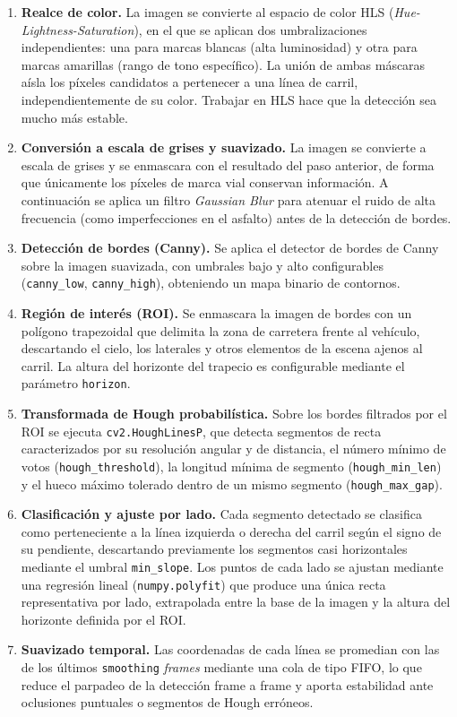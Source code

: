\documentclass[12pt, a4paper]{article}
\begin{document}
\begin{enumerate}
	\item \textbf{Realce de color.} La imagen se convierte al espacio de color HLS (\textit{Hue-Lightness-Saturation}), en el que se aplican dos umbralizaciones independientes: una para marcas blancas (alta luminosidad) y otra para marcas amarillas (rango de tono específico). La unión de ambas máscaras aísla los píxeles candidatos a pertenecer a una línea de carril, independientemente de su color. Trabajar en HLS hace que la detección sea mucho más estable.
	\item \textbf{Conversión a escala de grises y suavizado.} La imagen se convierte a escala de grises y se enmascara con el resultado del paso anterior, de forma que únicamente los píxeles de marca vial conservan información. A continuación se aplica un filtro \textit{Gaussian Blur} para atenuar el ruido de alta frecuencia (como imperfecciones en el asfalto) antes de la detección de bordes.
	\item \textbf{Detección de bordes (Canny).} Se aplica el detector de bordes de Canny sobre la imagen suavizada, con umbrales bajo y alto configurables (\texttt{canny\_low}, \texttt{canny\_high}), obteniendo un mapa binario de contornos.
	\item \textbf{Región de interés (ROI).} Se enmascara la imagen de bordes con un polígono trapezoidal que delimita la zona de carretera frente al vehículo, descartando el cielo, los laterales y otros elementos de la escena ajenos al carril. La altura del horizonte del trapecio es configurable mediante el parámetro \texttt{horizon}.
	\item \textbf{Transformada de Hough probabilística.} Sobre los bordes filtrados por el ROI se ejecuta \texttt{cv2.HoughLinesP}, que detecta segmentos de recta caracterizados por su resolución angular y de distancia, el número mínimo de votos (\texttt{hough\_threshold}), la longitud mínima de segmento (\texttt{hough\_min\_len}) y el hueco máximo tolerado dentro de un mismo segmento (\texttt{hough\_max\_gap}).
	\item \textbf{Clasificación y ajuste por lado.} Cada segmento detectado se clasifica como perteneciente a la línea izquierda o derecha del carril según el signo de su pendiente, descartando previamente los segmentos casi horizontales mediante el umbral \texttt{min\_slope}. Los puntos de cada lado se ajustan mediante una regresión lineal (\texttt{numpy.polyfit}) que produce una única recta representativa por lado, extrapolada entre la base de la imagen y la altura del horizonte definida por el ROI.
	\item \textbf{Suavizado temporal.} Las coordenadas de cada línea se promedian con las de los últimos \texttt{smoothing} \textit{frames} mediante una cola de tipo FIFO, lo que reduce el parpadeo de la detección frame a frame y aporta estabilidad ante oclusiones puntuales o segmentos de Hough erróneos.
\end{enumerate}
\end{document}
